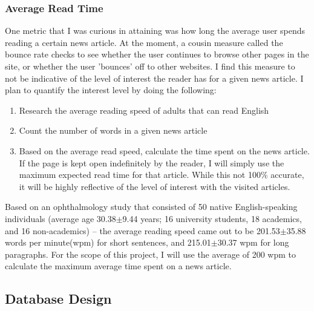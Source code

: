 \documentclass[12pt]{article}
\begin{document}
\subsubsection{Average Read Time}

One metric that I was curious in attaining was how long the average user spends reading a certain news article. At the moment, a cousin measure called the bounce rate checks to see whether the user continues to browse other pages in the site, or whether the user 'bounces' off to other websites. I find this measure to not be indicative of the level of interest the reader has for a given news article. I plan to quantify the interest level by doing the following:
\begin{enumerate}
\item Research the average reading speed of adults that can read English
\item Count the number of words in a given news article
\item Based on the average read speed, calculate the time spent on the news article. If the page is kept open indefinitely by the reader, I will simply use the maximum expected read time for that article. While this not 100\% accurate, it will be highly reflective of the level of interest with the visited articles. 
\end{enumerate}     

\noindent Based on an ophthalmology study that consisted of 50 native English-speaking individuals (average age 30.38$\pm$9.44 years; 16 university students, 18 academics, and 16 non-academics) -- the average reading speed came out to be 201.53$\pm$35.88 words per minute(wpm) for short sentences, and 215.01$\pm$30.37 wpm for long paragraphs\cite{radner}. For the scope of this project, I will use the average of 200 wpm to calculate the maximum average time spent on a news article.  

\vfill

\subsection{Database Design}
\end{document}
